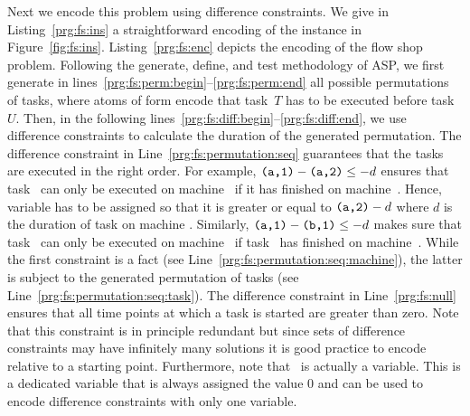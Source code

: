 \begin{example}


%
Next we encode this problem using difference constraints.
We give in Listing~\ref{prg:fs:ins} a straightforward encoding of the instance in Figure~\ref{fig:fs:ins}.
Listing~\ref{prg:fs:enc} depicts the encoding of the flow shop problem.
Following the generate, define, and test methodology of ASP,
we first generate in lines~\ref{prg:fs:perm:begin}--\ref{prg:fs:perm:end} all possible permutations of tasks,
where atoms of form  encode that task~$T$ has to be executed before task~$U$.
Then, in the following lines~\ref{prg:fs:diff:begin}--\ref{prg:fs:diff:end},
we use difference constraints to calculate the duration of the generated permutation.
%
The difference constraint in Line~\ref{prg:fs:permutation:seq} guarantees that the tasks are executed in the right order.
For example, $\texttt{(a,1)} - \texttt{(a,2)} \leq -d$ ensures that task~ can only be executed on machine~ if it has finished on machine~.
Hence, variable  has to be assigned so that it is greater or equal to $\texttt{(a,2)}-d$ where $d$ is the duration of task  on machine .
Similarly, $\texttt{(a,1)} - \texttt{(b,1)} \leq -d$ makes sure that task~ can only be executed on machine~ if task~ has finished on machine~.
While the first constraint is a fact (see Line~\ref{prg:fs:permutation:seq:machine}),
the latter is subject to the generated permutation of tasks (see Line~\ref{prg:fs:permutation:seq:task}).
%
The difference constraint in Line~\ref{prg:fs:null} ensures that all time points at which a task is started are greater than zero.
Note that this constraint is in principle redundant
but since sets of difference constraints may have infinitely many solutions
it is good practice to encode relative to a starting point.
Furthermore, note that~ is actually a variable.
This is a dedicated variable that is always assigned the value 0 and can be used to encode difference constraints with only one variable.


\end{example}
